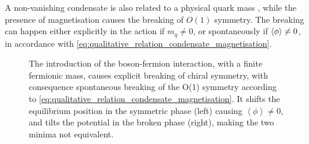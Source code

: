 A non-vanishing condensate is also related to a physical quark mass \cite{Ayala2021QCDDescriptions,MANOHAR1984189}, while the presence of magnetisation causes the breaking of $O(1)$ symmetry.
The breaking can happen either explicitly in the action if $m_q \neq 0$, or spontaneously if $\left\langle \phi \right\rangle \neq 0$, in accordance with \eqref{eq:qualitative_relation_condensate_magnetisation}.
\begin{figure}
\centering
\begin{minipage}{0.45\textwidth}
\end{minipage}
\hfill
\begin{minipage}{0.45\textwidth}
\end{minipage}
\label{fig:breaking_O1_symmetry}
\caption[Classical potential and symmetry breaking]{The introduction of the boson-fermion interaction, with a finite fermionic mass, causes explicit breaking of chiral symmetry, with consequence spontaneous breaking of the O(1) symmetry according to \eqref{eq:qualitative_relation_condensate_magnetisation}. It shifts the equilibrium position in the symmetric phase (left) causing $\left\langle \phi \right\rangle \neq 0$, and tilts the potential in the broken phase (right), making the two minima not equivalent.}
\end{figure}

